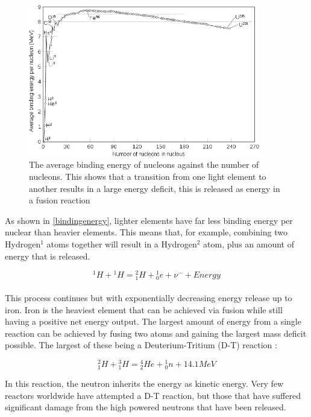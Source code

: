 \documentclass[12pt,a4paper,oneside]{report}
\begin{document}
\begin{figure}[H]
\includegraphics[width=0.9\textwidth, center]{Images/Bindingenergy.png}
\caption{The average binding energy of nucleons against the number of nucleons. This shows that a transition from one light element to another results in a large energy deficit, this is released as energy in a fusion reaction \cite{Fastfission2008BindingNucleon}}
\label{bindingenergy}
\end{figure}

As shown in \autoref{bindingenergy}, lighter elements have far less binding energy per nuclear than heavier elements. This means that, for example, combining two Hydrogen$^{1}$ atoms together will result in a Hydrogen$^{2}$ atom, plus an amount of energy that is released.

\begin{equation}
{^{1}H} + {^{1}H} = {^{2}_{1}H} + {^{1}_{0}e} + {\nu}^{-} + Energy
\end{equation}
\\
This process continues but with exponentially decreasing energy release up to iron. Iron is the heaviest element that can be achieved via fusion while still having a positive net energy output. The largest amount of energy from a single reaction can be achieved by fusing two atoms and gaining the largest mass deficit possible. The largest of these being a Deuterium-Tritium (D-T) reaction \cite[p. 430]{Shultis2016FundamentalsEdition.}:

\begin{equation}
{^{2}_{1}H} + {^{3}_{1}H} = {^{4}_{2}He} + {^{1}_{0}n} + 14.1MeV
\end{equation}

In this reaction, the neutron inherits the energy as kinetic energy. Very few reactors worldwide have attempted a D-T reaction, but those that have suffered significant damage from the high powered neutrons that have been released.
\end{document}
